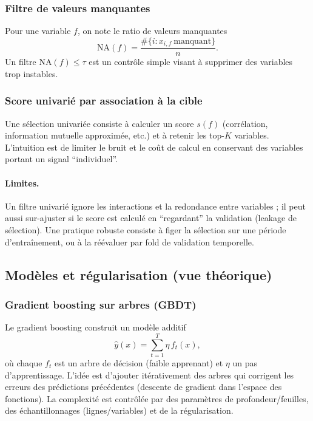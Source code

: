 \documentclass[11pt,a4paper]{article}
\newcommand{\1}{\mathbf{1}}
\begin{document}
\subsubsection{Filtre de valeurs manquantes}
Pour une variable $f$, on note le ratio de valeurs manquantes
\[
\mathrm{NA}(f)=\frac{\#\{i: x_{i,f}\ \text{manquant}\}}{n}.
\]
Un filtre $\mathrm{NA}(f)\le \tau$ est un contr\^ole simple visant \`a supprimer des variables trop instables.

\subsubsection{Score univari\'e par association \`a la cible}
Une s\'election univari\'ee consiste \`a calculer un score $s(f)$ (corr\'elation, information mutuelle approxim\'ee, etc.) et \`a retenir les top-$K$
variables. L'intuition est de limiter le bruit et le co\^ut de calcul en conservant des variables portant un signal ``individuel''.

\paragraph{Limites.}
Un filtre univari\'e ignore les interactions et la redondance entre variables ; il peut aussi sur-ajuster si le score est calcul\'e en ``regardant''
la validation (leakage de s\'election). Une pratique robuste consiste \`a figer la s\'election sur une p\'eriode d'entra\^{i}nement, ou \`a la r\'e\'evaluer
par fold de validation temporelle.

\subsection{Mod\`eles et r\'egularisation (vue th\'eorique)}

\subsubsection{Gradient boosting sur arbres (GBDT)}
Le gradient boosting construit un mod\`ele additif
\[
\widehat y(x)=\sum_{t=1}^T \eta\, f_t(x),
\]
o\`u chaque $f_t$ est un arbre de d\'ecision (faible apprenant) et $\eta$ un pas d'apprentissage. L'id\'ee est d'ajouter it\'erativement des arbres
qui corrigent les erreurs des pr\'edictions pr\'ec\'edentes (descente de gradient dans l'espace des fonctions).
La complexit\'e est contr\^ol\'ee par des param\`etres de profondeur/feuilles, des \'echantillonnages (lignes/variables) et de la r\'egularisation.
\end{document}

